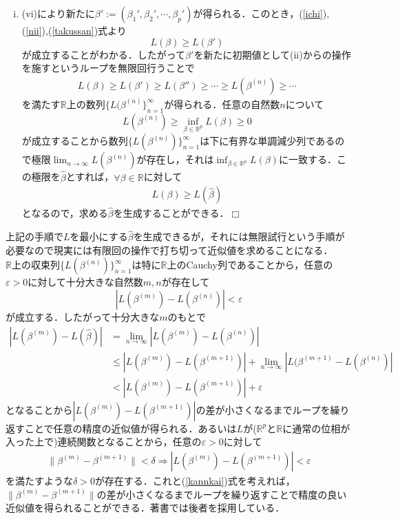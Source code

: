 \documentclass{jsarticle}
\theoremstyle{definition}
\theoremstyle{mystyle} %
\def\qed{\hfill$\Box$}
\begin{document}
\begin{enumerate}[(i)]
\item (vi)により新たに$\beta':=(\beta_1',\beta_2',\cdots,\beta_p')$が得られる．このとき，(\ref{ichi}),(\ref{nii}),(\ref{takussan})式より
$$ L(\beta)\geq L(\beta')$$
が成立することがわかる．したがって$\beta'$を新たに初期値として(ii)からの操作を施すというループを無限回行うことで
\begin{align*}
L(\beta)\geq L(\beta')\geq L(\beta'')\geq\cdots\geq L(\beta^{(n)})\geq \cdots
\end{align*}
を満たす$\mathbb{R}$上の数列$\{L(\beta^{(n)}\}_{n=1}^{\infty}$が得られる．任意の自然数$n$について
$$L(\beta^{(n)})\geq \inf_{\beta\in\mathbb{R}^p}L(\beta)\geq 0$$
が成立することから数列$\{L(\beta^{(n)})\}_{n=1}^{\infty}$は下に有界な単調減少列であるので極限$\displaystyle\lim_{n\to\infty}L(\beta^{(n)})$が存在し，それは$ \displaystyle\inf_{\beta\in\mathbb{R}^p}L(\beta)$に一致する．この極限を$\hat{\beta}$とすれば，$\forall \beta\in \mathbb{R}$に対して
\begin{align*}
L(\beta)\geq L(\hat{\beta})
\end{align*}
となるので，求める$\hat{\beta}$を生成することができる．\qed\\
\end{enumerate}

上記の手順で$L$を最小にする$\hat{\beta}$を生成できるが，それには無限試行という手順が必要なので現実には有限回の操作で打ち切って近似値を求めることになる．\\

$\mathbb{R}$上の収束列$\{L(\beta^{(n)})\}_{n=1}^{\infty}$は特に$\mathbb{R}$上のCauchy列であることから，任意の$\varepsilon>0$に対して十分大きな自然数$m,n$が存在して
$$|L(\beta^{(m)})-L(\beta^{(n)})|<\varepsilon$$
が成立する．したがって十分大きな$m$のもとで
\begin{equation}
\begin{split}
\label{kannkai}
|L(\beta^{(m)})-L(\hat{\beta})|&=\lim_{n\to\infty}|L(\beta^{(m)})-L(\beta^{(n)})|\\
&\leq |L(\beta^{(m)})-L(\beta^{(m+1)})|+\lim_{n\to\infty}|L(\beta^{(m+1)}-L(\beta^{(n)})|\\
&< |L(\beta^{(m)})-L(\beta^{(m+1)})|+\varepsilon
\end{split}
\end{equation}
となることから$ |L(\beta^{(m)})-L(\beta^{(m+1)})|$の差が小さくなるまでループを繰り返すことで任意の精度の近似値が得られる．あるいは$L$が($\mathbb{R}^p$と$\mathbb{R}$に通常の位相が入った上で)連続関数となることから，任意の$\varepsilon>0$に対して
\begin{align*}
\|\beta^{(m)}-\beta^{(m+1)}\|<\delta\Rightarrow |L(\beta^{(m)})-L(\beta^{(m+1)})|<\varepsilon
\end{align*}
を満たすような$\delta>0$が存在する．これと(\ref{kannkai})式を考えれば，$\|\beta^{(m)}-\beta^{(m+1)}\|$の差が小さくなるまでループを繰り返すことで精度の良い近似値を得られることができる．著書では後者を採用している．\\
\end{document}
